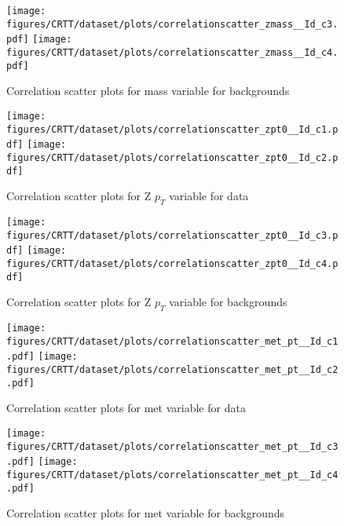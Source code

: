 \begin{figure}[!htb]%
\centering
\texttt{[image: figures/CRTT/dataset/plots/correlationscatter\_zmass\_\_Id\_c3.pdf]}
\texttt{[image: figures/CRTT/dataset/plots/correlationscatter\_zmass\_\_Id\_c4.pdf]}
\caption{ Correlation scatter plots for \Zll mass variable for backgrounds}%
\label{fig:correlations_CRTT_zmass_BG}                                                       
\end{figure}\clearpage



\begin{figure}[!htb]%
\centering
\texttt{[image: figures/CRTT/dataset/plots/correlationscatter\_zpt0\_\_Id\_c1.pdf]}
\texttt{[image: figures/CRTT/dataset/plots/correlationscatter\_zpt0\_\_Id\_c2.pdf]}
\caption{ Correlation scatter plots for Z $p_{T}$  variable for data}%
\label{fig:correlations_CRTT_zpt_S}                                                       
\end{figure}\clearpage



\begin{figure}[!htb]%
\centering
\texttt{[image: figures/CRTT/dataset/plots/correlationscatter\_zpt0\_\_Id\_c3.pdf]}
\texttt{[image: figures/CRTT/dataset/plots/correlationscatter\_zpt0\_\_Id\_c4.pdf]}
\caption{ Correlation scatter plots for Z $p_{T}$ variable for backgrounds}%
\label{fig:correlations_CRTT_zpt_BG}                                                       
\end{figure}\clearpage


\begin{figure}[!htb]%
\centering
\texttt{[image: figures/CRTT/dataset/plots/correlationscatter\_met\_pt\_\_Id\_c1.pdf]}
\texttt{[image: figures/CRTT/dataset/plots/correlationscatter\_met\_pt\_\_Id\_c2.pdf]}
\caption{ Correlation scatter plots for met variable for data}%
\label{fig:correlations_CRTT_met_pt_S}                                                       
\end{figure}\clearpage



\begin{figure}[!htb]%
\centering
\texttt{[image: figures/CRTT/dataset/plots/correlationscatter\_met\_pt\_\_Id\_c3.pdf]}
\texttt{[image: figures/CRTT/dataset/plots/correlationscatter\_met\_pt\_\_Id\_c4.pdf]}
\caption{ Correlation scatter plots for met variable for backgrounds}%
\label{fig:correlations_CRTT_met_pt_BG}                                                       
\end{figure}\clearpage





